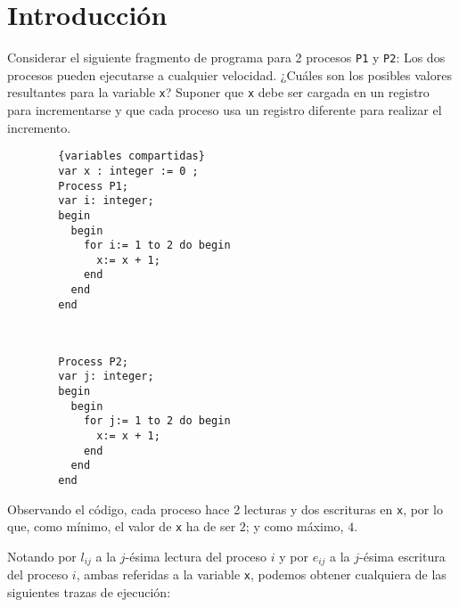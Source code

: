 \section{Introducción}

\begin{ejercicio}
    Considerar el siguiente fragmento de programa para 2 procesos \verb|P1| y \verb|P2|: Los dos procesos
    pueden ejecutarse a cualquier velocidad. ¿Cuáles son los posibles valores resultantes para la
    variable \verb|x|? Suponer que \verb|x| debe ser cargada en un registro para incrementarse y que cada
    proceso usa un registro diferente para realizar el incremento.
    \setlength{\columnsep}{2cm} %
    \begin{multicols}{2}
        \begin{verbatim}
        {variables compartidas}
        var x : integer := 0 ;
        Process P1;
        var i: integer;
        begin
          begin
            for i:= 1 to 2 do begin
              x:= x + 1;
            end
          end
        end
        \end{verbatim}
        
        \begin{verbatim}
            

        Process P2;
        var j: integer;
        begin
          begin
            for j:= 1 to 2 do begin
              x:= x + 1;
            end
          end
        end
        \end{verbatim}
    \end{multicols}

\noindent
Observando el código, cada proceso hace 2 lecturas y dos escrituras en \verb|x|, por lo que, como mínimo, el valor de \verb|x| ha de ser $2$; y como máximo, $4$.

Notando por $l_{ij}$ a la $j$-ésima lectura del proceso $i$ y por $e_{ij}$ a la $j$-ésima escritura del proceso $i$, ambas referidas a la variable \verb|x|, podemos obtener cualquiera de las siguientes trazas de ejecución:


\end{ejercicio}
